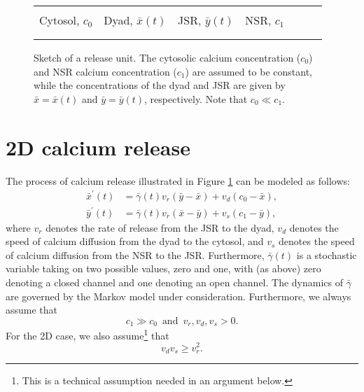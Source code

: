 \begin{figure}
[ptb]
\begin{center}
\begin{tabular}{c!{\vrule width 1pt}c!{\vrule width 1pt}c!{\vrule width 1pt}c} 
&&& \\
Cytosol, $c_0$ & Dyad, $\bar{x}(t)$ & JSR, $\bar{y}(t)$ & NSR, $c_1$ \ \ \ \ \  \\
&&& \\ 
\end{tabular}
\caption{Sketch of a release unit. The cytosolic calcium concentration ($c_0$) and NSR calcium concentration ($c_1$) are assumed to be constant, while the concentrations
of the dyad and JSR are given by $\bar{x}=\bar{x}(t)$ and $\bar{y}=\bar{y}(t)$, respectively. Note that $c_0\ll c_1$.}%
\label{geom2D}%
\end{center}
\end{figure}

\section{2D calcium release}

The process of calcium release illustrated in Figure \ref{geom2D} can be
modeled as follows:
\begin{align}
\bar{x}^{\prime}(t)  &  =\bar{\gamma}(t)v_{r}\left(  \bar{y}-\bar{x}\right)
+v_{d}\left(  c_{0}-\bar{x}\right)  ,\label{c1}\\
\bar{y}^{\prime}(t)  &  =\bar{\gamma}(t)v_{r}\left(  \bar{x}-\bar{y}\right)
+v_{s}\left(  c_{1}-\bar{y}\right)  , \label{c2}%
\end{align}
where $v_{r}$ denotes the rate of release from the JSR to the dyad, $v_{d}$ denotes the
speed of calcium diffusion from the dyad to the cytosol, and $v_{s}$ denotes
the speed of calcium diffusion from the NSR to the JSR. Furthermore, $\bar{\gamma}(t)$
is a stochastic variable taking on two possible values, zero and one, with (as
above) zero denoting a closed channel and one denoting an open channel. The
dynamics of $\bar{\gamma}$ are governed by the Markov model under
consideration. Furthermore, we always assume that
\begin{equation}
 c_{1}\gg c_{0} \, \mbox{ and } \, v_r,v_d,v_s >0.  \label{assumption1}
\end{equation}
For the 2D case, we also assume\footnote{This is a technical assumption needed in an argument below. } that
\begin{equation}
v_{d}v_{s}\ge v_{r}^{2}.  \label{assumption2}
\end{equation}

